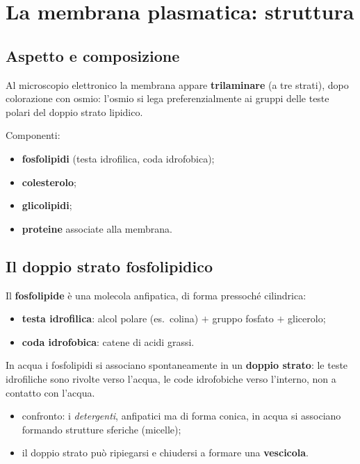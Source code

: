 \section{La membrana plasmatica: struttura}

\subsection{Aspetto e composizione}

Al microscopio elettronico la membrana appare \textbf{trilaminare} (a tre strati), dopo colorazione con osmio: l'osmio si lega preferenzialmente ai gruppi delle teste polari del doppio strato lipidico.

Componenti:
\begin{itemize}
  \item \textbf{fosfolipidi} (testa idrofilica, coda idrofobica);
  \item \textbf{colesterolo};
  \item \textbf{glicolipidi};
  \item \textbf{proteine} associate alla membrana.
\end{itemize}

\subsection{Il doppio strato fosfolipidico}

Il \textbf{fosfolipide} è una molecola anfipatica, di forma pressoché cilindrica:
\begin{itemize}
  \item \textbf{testa idrofilica}: alcol polare (es.\ colina) $+$ gruppo fosfato $+$ glicerolo;
  \item \textbf{coda idrofobica}: catene di acidi grassi.
\end{itemize}
In acqua i fosfolipidi si associano spontaneamente in un \textbf{doppio strato}: le teste idrofiliche sono rivolte verso l'acqua, le code idrofobiche verso l'interno, non a contatto con l'acqua.
\begin{itemize}
  \item confronto: i \textit{detergenti}, anfipatici ma di forma conica, in acqua si associano formando strutture sferiche (micelle);
  \item il doppio strato può ripiegarsi e chiudersi a formare una \textbf{vescicola}.
\end{itemize}


